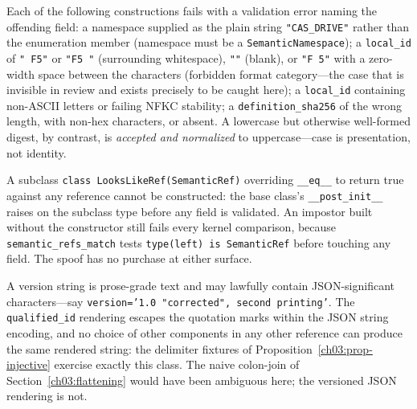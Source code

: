 \begin{example}\label{ch03:ex-malformed}
Each of the following constructions fails with a validation
error naming the offending field: a namespace supplied as the
plain string \texttt{"CAS\_DRIVE"} rather than the enumeration
member (namespace must be a \texttt{SemanticNamespace}); a
\texttt{local\_id} of \texttt{"~F5"} or \texttt{"F5~"}
(surrounding whitespace), \texttt{""} (blank), or \texttt{"F\,5"}
with a zero-width space between the characters (forbidden format
category---the case that is invisible in review and exists
precisely to be caught here); a \texttt{local\_id} containing
non-ASCII letters or failing NFKC stability; a
\texttt{definition\_sha256} of the wrong length, with non-hex
characters, or absent. A lowercase but otherwise well-formed
digest, by contrast, is \emph{accepted and normalized} to
uppercase---case is presentation, not identity.
\end{example}

\begin{example}\label{ch03:ex-impostor}
A subclass \texttt{class LooksLikeRef(SemanticRef)} overriding
\texttt{\_\_eq\_\_} to return true against any reference cannot be
constructed: the base class's \texttt{\_\_post\_init\_\_} raises
on the subclass type before any field is validated. An impostor
built without the constructor still fails every kernel comparison,
because \texttt{semantic\_refs\_match} tests
\texttt{type(left) is SemanticRef} before touching any field. The
spoof has no purchase at either surface.
\end{example}

\begin{example}\label{ch03:ex-delimiter}
A version string is prose-grade text and may lawfully contain
JSON-significant characters---say
\texttt{version='1.0 "corrected", second printing'}. The
\texttt{qualified\_id} rendering escapes the quotation marks
within the JSON string encoding, and no choice of other
components in any other reference can produce the same rendered
string: the delimiter fixtures of
Proposition~\ref{ch03:prop-injective} exercise exactly this class.
The naive colon-join of Section~\ref{ch03:flattening} would have
been ambiguous here; the versioned JSON rendering is not.
\end{example}

